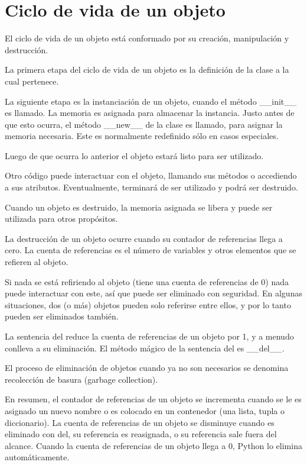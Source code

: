 \documentclass{report}
\begin{document}
\section{Ciclo de vida de un objeto}

El ciclo de vida de un objeto está conformado por su creación, manipulación y destrucción.

La primera etapa del ciclo de vida de un objeto es la definición de la clase a la cual pertenece.

La siguiente etapa es la instanciación de un objeto, cuando el método \_\_init\_\_ es llamado. La memoria es asignada para almacenar la instancia. Justo antes de que esto ocurra, el método \_\_new\_\_ de la clase es llamado, para asignar la memoria necesaria. Este es normalmente redefinido sólo en casos especiales.

Luego de que ocurra lo anterior el objeto estará listo para ser utilizado.

Otro código puede interactuar con el objeto, llamando sus métodos o accediendo a sus atributos. Eventualmente, terminará de ser utilizado y podrá ser destruido.

Cuando un objeto es destruido, la memoria asignada se libera y puede ser utilizada para otros propósitos.

La destrucción de un objeto ocurre cuando su contador de referencias llega a cero. La cuenta de referencias es el número de variables y otros elementos que se refieren al objeto.

Si nada se está refiriendo al objeto (tiene una cuenta de referencias de 0) nada puede interactuar con este, así que puede ser eliminado con seguridad.
En algunas situaciones, dos (o más) objetos pueden solo referirse entre ellos, y por lo tanto pueden ser eliminados también.

La sentencia del reduce la cuenta de referencias de un objeto por 1, y a menudo conlleva a su eliminación. El método mágico de la sentencia del es \_\_del\_\_.

El proceso de eliminación de objetos cuando ya no son necesarios se denomina recolección de basura (garbage collection).

En resumen, el contador de referencias de un objeto se incrementa cuando se le es asignado un nuevo nombre o es colocado en un contenedor (una lista, tupla o diccionario). La cuenta de referencias de un objeto se disminuye cuando es eliminado con del, su referencia es reasignada, o su referencia sale fuera del alcance. Cuando la cuenta de referencias de un objeto llega a 0, Python lo elimina automáticamente.
\end{document}

